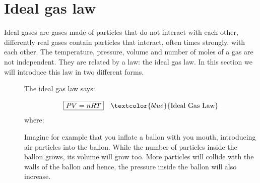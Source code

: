 \documentclass[main.tex]{subfiles}
\begin{document}
\section{Ideal gas law}
Ideal gases are gases made of particles that do not interact with each other, differently real gases contain particles that interact, often times strongly, with each other. The temperature, pressure, volume and number of moles of a gas are not independent. They are related by a law: the ideal gas law. In this section we will introduce this law in two different forms.
\sloppy 
\begin{description}
\item[] 
The ideal gas law says:

\begin{equation*}\begin{split}
\boxed{  PV=nRT} \quad \textcolor{blue}{\text{Ideal Gas Law}}
\end{split}\end{equation*}
where:
Imagine for example that you inflate a ballon with you mouth, introducing air particles into the ballon.
While the number of particles inside the ballon grows, its volume will grow too. More particles will collide with the walls of the ballon and hence, the pressure inside the ballon will also increase. 


\end{description}
\end{document}
